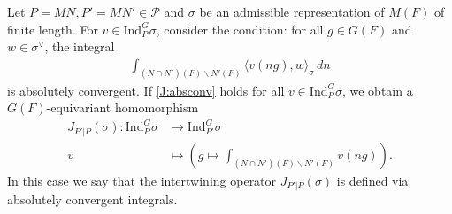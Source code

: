 \documentclass[10pt]{amsart}
\theoremstyle{definition}
\numberwithin{equation}{section}
\numberwithin{equation}{subsection}
\newcommand{\Ind}{\mathrm{Ind}}
\begin{document}


Let $P=MN,P'=MN'\in \mathcal{P}$ and $\sigma$ be an admissible representation of $M(F)$ of finite length. For $v\in\Ind_P^G\sigma$, consider the condition: for all $g\in G(F)$ and $w\in\sigma^\vee$, the integral
\begin{align}\label{J:absconv}\tag{$\clubsuit$}
    \int_{(N\cap N')(F)\backslash N'(F)} \langle v(ng), w\rangle_{\sigma} \,dn
\end{align}
is absolutely convergent. If \eqref{J:absconv} holds for all $v\in \Ind_P^G \sigma$, we obtain a $G(F)$-equivariant homomorphism
\begin{align*}
    J_{P'|P}(\sigma):\mathrm{Ind}_P^G\sigma&\longrightarrow\Ind_{P'}^G\sigma\\v&\longmapsto\left(g\mapsto  \int_{(N\cap N')(F)\backslash N'(F)} v(ng)\right).
\end{align*}
In this case we say that the intertwining operator $J_{P'|P}(\sigma)$ is defined via absolutely convergent integrals.
\end{document}
